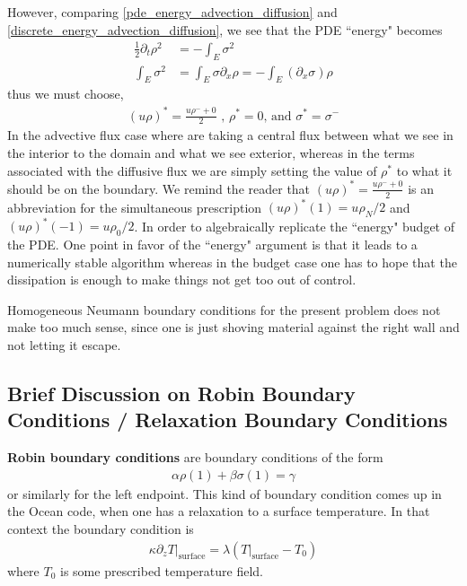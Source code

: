 \documentclass{report}
\numberwithin{equation}{section}
\begin{document}
However, comparing \ref{pde_energy_advection_diffusion} and \ref{discrete_energy_advection_diffusion}, we see that the PDE ``energy" becomes
\begin{align}
\label{explicit_pde_energy_advection_diffusion}
    \frac{1}{2} \partial_t \rho^2 &= - \int_E \sigma^2 
    \\
    \int_E \sigma^2 &= \int_E \sigma \partial_x \rho = - \int_E (\partial_x \sigma) \rho
\end{align}
thus we must choose,
\begin{align}
(u\rho)^* = \frac{u \rho^- + 0}{2} \text{ , } \rho^* = 0 \text{, and } \sigma^* = \sigma^- 
\end{align}
In the advective flux case where are taking a central flux between what we see in the interior to the domain and what we see exterior, whereas in the terms associated with the diffusive flux we are simply setting the value of $\rho^*$ to what it should be on the boundary. We remind the reader that $(u\rho)^* = \frac{u \rho^- + 0}{2}$ is an abbreviation for the simultaneous prescription $(u\rho)^*(1) = u \rho_N/2 $ and $(u\rho)^*(-1) = u \rho_0 /2 $.
In order to algebraically replicate the ``energy" budget of the PDE. One point in favor of the ``energy" argument is that it leads to a  numerically stable algorithm whereas in the budget case one has to hope that the dissipation is enough to make things not get too out of control. 

Homogeneous Neumann boundary conditions for the present problem does not make too much sense, since one is just shoving material against the right wall and not letting it escape. 

\subsection{Brief Discussion on Robin Boundary Conditions / Relaxation Boundary Conditions}

\textbf{Robin boundary conditions} are boundary conditions of the form
\begin{align}
\label{robin_boundary_condition_right}
    \alpha \rho(1) + \beta \sigma(1) = \gamma
\end{align}
or similarly for the left endpoint. This kind of boundary condition comes up in the Ocean code, when one has a relaxation to a surface temperature. In that context the boundary condition is
\begin{align}
   \left. \kappa \partial_z T \right|_\text{surface} = \lambda \left( \left. T \right|_\text{surface} - T_0 \right)
\end{align}
where $T_0$ is some prescribed temperature field. 
\end{document}
